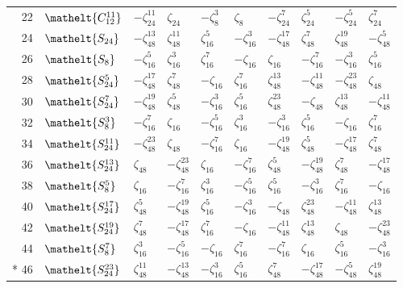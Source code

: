 \documentclass[10pt,a4paper]{article}
\numberwithin{equation}{section}
\newcommand{\eltfont}[1]{{\let\sigma\eltsigma\mathelt{#1}}}
\newcommand{\cls}[1]{\eltfont{#1}}
\newcommand{\rootunity}[1]{\zeta_{#1}}
\begin{document}
{\begin{longtable}{@{}rlllllllll@{}}
22 & $\cls{C_{12}^{11}}$ & $-\rootunity{24}^{11}$ & $\rootunity{24}$ & $-\rootunity{8}^{3}$ & $\rootunity{8}$ & $-\rootunity{24}^{7}$ & $\rootunity{24}^{5}$ & $-\rootunity{24}^{5}$ & $\rootunity{24}^{7}$\\
24 & $\cls{S_{24}}$ & $-\rootunity{48}^{13}$ & $\rootunity{48}^{11}$ & $\rootunity{16}^{5}$ & $-\rootunity{16}^{3}$ & $-\rootunity{48}^{17}$ & $\rootunity{48}^{7}$ & $\rootunity{48}^{19}$ & $-\rootunity{48}^{5}$\\
26 & $\cls{S_{8}}$ & $-\rootunity{16}^{5}$ & $\rootunity{16}^{3}$ & $\rootunity{16}^{7}$ & $-\rootunity{16}$ & $\rootunity{16}$ & $-\rootunity{16}^{7}$ & $-\rootunity{16}^{3}$ & $\rootunity{16}^{5}$\\
28 & $\cls{S_{24}^{5}}$ & $-\rootunity{48}^{17}$ & $\rootunity{48}^{7}$ & $-\rootunity{16}$ & $\rootunity{16}^{7}$ & $\rootunity{48}^{13}$ & $-\rootunity{48}^{11}$ & $-\rootunity{48}^{23}$ & $\rootunity{48}$\\
30 & $\cls{S_{24}^{7}}$ & $-\rootunity{48}^{19}$ & $\rootunity{48}^{5}$ & $-\rootunity{16}^{3}$ & $\rootunity{16}^{5}$ & $\rootunity{48}^{23}$ & $-\rootunity{48}$ & $\rootunity{48}^{13}$ & $-\rootunity{48}^{11}$\\
32 & $\cls{S_{8}^{3}}$ & $-\rootunity{16}^{7}$ & $\rootunity{16}$ & $-\rootunity{16}^{5}$ & $\rootunity{16}^{3}$ & $-\rootunity{16}^{3}$ & $\rootunity{16}^{5}$ & $-\rootunity{16}$ & $\rootunity{16}^{7}$\\
34 & $\cls{S_{24}^{11}}$ & $-\rootunity{48}^{23}$ & $\rootunity{48}$ & $-\rootunity{16}^{7}$ & $\rootunity{16}$ & $-\rootunity{48}^{19}$ & $\rootunity{48}^{5}$ & $-\rootunity{48}^{17}$ & $\rootunity{48}^{7}$\\
36 & $\cls{S_{24}^{13}}$ & $\rootunity{48}$ & $-\rootunity{48}^{23}$ & $\rootunity{16}$ & $-\rootunity{16}^{7}$ & $\rootunity{48}^{5}$ & $-\rootunity{48}^{19}$ & $\rootunity{48}^{7}$ & $-\rootunity{48}^{17}$\\
38 & $\cls{S_{8}^{5}}$ & $\rootunity{16}$ & $-\rootunity{16}^{7}$ & $\rootunity{16}^{3}$ & $-\rootunity{16}^{5}$ & $\rootunity{16}^{5}$ & $-\rootunity{16}^{3}$ & $\rootunity{16}^{7}$ & $-\rootunity{16}$\\
40 & $\cls{S_{24}^{17}}$ & $\rootunity{48}^{5}$ & $-\rootunity{48}^{19}$ & $\rootunity{16}^{5}$ & $-\rootunity{16}^{3}$ & $-\rootunity{48}$ & $\rootunity{48}^{23}$ & $-\rootunity{48}^{11}$ & $\rootunity{48}^{13}$\\
42 & $\cls{S_{24}^{19}}$ & $\rootunity{48}^{7}$ & $-\rootunity{48}^{17}$ & $\rootunity{16}^{7}$ & $-\rootunity{16}$ & $-\rootunity{48}^{11}$ & $\rootunity{48}^{13}$ & $\rootunity{48}$ & $-\rootunity{48}^{23}$\\
44 & $\cls{S_{8}^{7}}$ & $\rootunity{16}^{3}$ & $-\rootunity{16}^{5}$ & $-\rootunity{16}$ & $\rootunity{16}^{7}$ & $-\rootunity{16}^{7}$ & $\rootunity{16}$ & $\rootunity{16}^{5}$ & $-\rootunity{16}^{3}$\\*
46 & $\cls{S_{24}^{23}}$ & $\rootunity{48}^{11}$ & $-\rootunity{48}^{13}$ & $-\rootunity{16}^{3}$ & $\rootunity{16}^{5}$ & $\rootunity{48}^{7}$ & $-\rootunity{48}^{17}$ & $-\rootunity{48}^{5}$ & $\rootunity{48}^{19}$\\
\bottomrule\end{longtable}}
\end{document}
